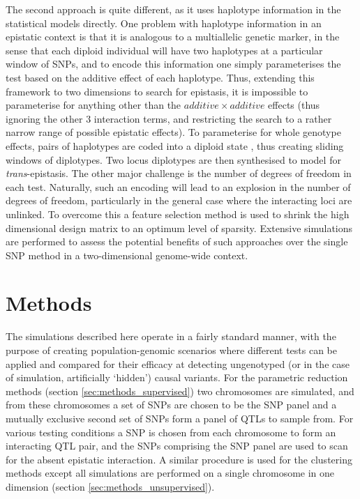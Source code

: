 The second approach is quite different, as it uses haplotype information in the statistical models directly. One problem with haplotype information in an epistatic context is that it is analogous to a multiallelic genetic marker, in the sense that each diploid individual will have two haplotypes at a particular window of SNPs, and to encode this information one simply parameterises the test based on the additive effect of each haplotype. Thus, extending this framework to two dimensions to search for epistasis, it is impossible to parameterise for anything other than the $additive \times additive$ effects (thus ignoring the other 3 interaction terms, and restricting the search to a rather narrow range of possible epistatic effects). To parameterise for whole genotype effects, pairs of haplotypes are coded into a diploid state \citep{Schaid2004}, thus creating sliding windows of diplotypes. Two locus diplotypes are then synthesised to model for \emph{trans}-epistasis. The other major challenge is the number of degrees of freedom in each test. Naturally, such an encoding will lead to an explosion in the number of degrees of freedom, particularly in the general case where the interacting loci are unlinked. To overcome this a feature selection method is used to shrink the high dimensional design matrix to an optimum level of sparsity. Extensive simulations are performed to assess the potential benefits of such approaches over the single SNP method in a two-dimensional genome-wide context.

\section{Methods}

The simulations described here operate in a fairly standard manner, with the purpose of creating population-genomic scenarios where different tests can be applied and compared for their efficacy at detecting ungenotyped (or in the case of simulation, artificially `hidden') causal variants. For the parametric reduction methods (section \ref{sec:methods_supervised}) two chromosomes are simulated, and from these chromosomes a set of SNPs are chosen to be the SNP panel and a mutually exclusive second set of SNPs form a panel of QTLs to sample from. For various testing conditions a SNP is chosen from each chromosome to form an interacting QTL pair, and the SNPs comprising the SNP panel are used to scan for the absent epistatic interaction. A similar procedure is used for the clustering methods except all simulations are performed on a single chromosome in one dimension (section \ref{sec:methods_unsupervised}).

